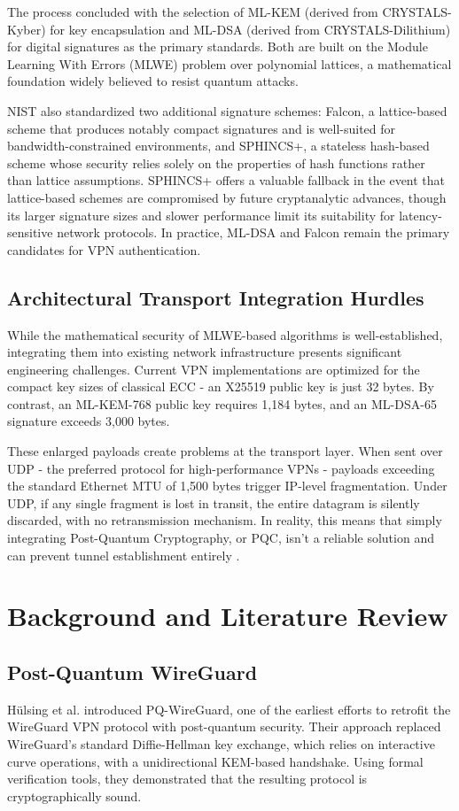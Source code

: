 \documentclass[10pt, conference, letterpaper]{IEEEtran}
\begin{document}
The process concluded with the selection of ML-KEM (derived from CRYSTALS-Kyber) for key encapsulation and ML-DSA (derived from CRYSTALS-Dilithium) for digital signatures as the primary standards. Both are built on the Module Learning With Errors (MLWE) problem over polynomial lattices, a mathematical foundation widely believed to resist quantum attacks.

NIST also standardized two additional signature schemes: Falcon, a lattice-based scheme that produces notably compact signatures and is well-suited for bandwidth-constrained environments, and SPHINCS+, a stateless hash-based scheme whose security relies solely on the properties of hash functions rather than lattice assumptions. SPHINCS+ offers a valuable fallback in the event that lattice-based schemes are compromised by future cryptanalytic advances, though its larger signature sizes and slower performance limit its suitability for latency-sensitive network protocols. In practice, ML-DSA and Falcon remain the primary candidates for VPN authentication.

\subsection{Architectural Transport Integration Hurdles}
While the mathematical security of MLWE-based algorithms is well-established, integrating them into existing network infrastructure presents significant engineering challenges. Current VPN implementations are optimized for the compact key sizes of classical ECC - an X25519 public key is just 32 bytes. By contrast, an ML-KEM-768 public key requires 1,184 bytes, and an ML-DSA-65 signature exceeds 3,000 bytes.

These enlarged payloads create problems at the transport layer. When sent over UDP - the preferred protocol for high-performance VPNs - payloads exceeding the standard Ethernet MTU of 1,500 bytes trigger IP-level fragmentation. Under UDP, if any single fragment is lost in transit, the entire datagram is silently discarded, with no retransmission mechanism. In reality, this means that simply integrating Post-Quantum Cryptography, or PQC, isn't a reliable solution and can prevent tunnel establishment entirely \cite{shim2025qtrustnet}.

\section{Background and Literature Review}

\subsection{Post-Quantum WireGuard}
H\"ulsing et al. \cite{hulsing2017pqwireguard} introduced PQ-WireGuard, one of the earliest efforts to retrofit the WireGuard VPN protocol with post-quantum security. Their approach replaced WireGuard's standard Diffie-Hellman key exchange, which relies on interactive curve operations, with a unidirectional KEM-based handshake. Using formal verification tools, they demonstrated that the resulting protocol is cryptographically sound.
\end{document}
